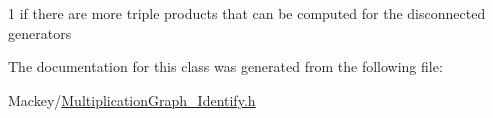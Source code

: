 1 if there are more triple products that can be computed for the disconnected generators 



The documentation for this class was generated from the following file\+:\begin{DoxyCompactItemize}
\item 
Mackey/\hyperlink{MultiplicationGraph__Identify_8h}{Multiplication\+Graph\+\_\+\+Identify.\+h}\end{DoxyCompactItemize}
